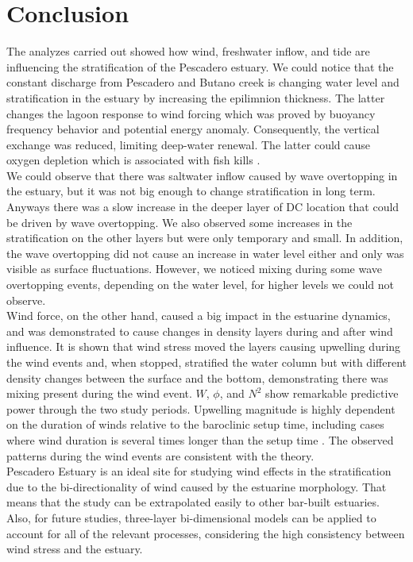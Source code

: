 \documentclass[tesis.tex]{subfiles}
\begin{document}
  
\section{Conclusion}

The analyzes carried out showed how wind, freshwater inflow, and tide are influencing the stratification of the Pescadero estuary. We could notice that the constant discharge from Pescadero and Butano creek is changing water level and stratification in the estuary by increasing the epilimnion thickness. The latter changes the lagoon response to wind forcing which was proved by buoyancy frequency behavior and potential energy anomaly. Consequently, the vertical exchange was reduced, limiting deep-water renewal. The latter could cause oxygen depletion which is associated with fish kills \citep{Kelly2018}.\\

We could observe that there was saltwater inflow caused by wave overtopping in the estuary, but it was not big enough to change stratification in long term. Anyways there was a slow increase in the deeper layer of DC location that could be driven by wave overtopping. We also observed some increases in the stratification on the other layers but were only temporary and small. In addition, the wave overtopping did not cause an increase in water level either and only was visible as surface fluctuations. However, we noticed mixing during some wave overtopping events, depending on the water level, for higher levels we could not observe.\\

Wind force, on the other hand, caused a big impact in the estuarine dynamics, and was demonstrated to cause changes in density layers during and after wind influence. It is shown that wind stress moved the layers causing upwelling during the wind events and, when stopped, stratified the water column but with different density changes between the surface and the bottom, demonstrating there was mixing present during the wind event. $W$, $\phi$, and $N^2$ show remarkable predictive power through the two study periods. Upwelling magnitude is highly dependent on the duration of winds relative to the baroclinic setup time, including cases where wind duration is several times longer than the setup time \citep{delafuente2010strong}. The observed patterns during the wind events are consistent with the theory.\\

Pescadero Estuary is an ideal site for studying wind effects in the stratification due to the bi-directionality of wind caused by the estuarine morphology. That means that the study can be extrapolated easily to other bar-built estuaries. Also, for future studies, three-layer bi-dimensional models can be applied to account for all of the relevant processes, considering the high consistency between wind stress and the estuary.\\
\end{document}
